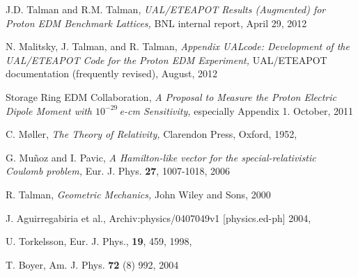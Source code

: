 \documentclass[]{article}
\begin{document}
\begin{thebibliography}{99}
J.D. Talman and R.M. Talman, \emph{ UAL/ETEAPOT Results 
(Augmented) for Proton EDM Benchmark Lattices,} BNL internal
report, April 29, 2012

N. Malitsky, J. Talman, and R. Talman, \emph{Appendix UALcode: Development of the
UAL/ETEAPOT Code for the Proton EDM Experiment,} UAL/ETEAPOT documentation
(frequently revised), August, 2012

Storage Ring EDM Collaboration, \emph{A Proposal to Measure the
Proton Electric Dipole Moment with $10^{-29}\,$e-cm Sensitivity,}
especially Appendix 1. October, 2011

C. M\o ller, \emph{The Theory of Relativity,} Clarendon Press,
Oxford, 1952, 

G. Mu\~{n}oz and I. Pavic, \emph{A Hamilton-like vector for
the special-relativistic Coulomb problem,} 
Eur. J. Phys. {\bf 27}, 1007-1018, 2006

R. Talman, \emph{Geometric Mechanics,} John Wiley and Sons, 2000

J. Aguirregabiria et al., 
Archiv:physics/0407049v1 [physics.ed-ph] 2004, 

U. Torkelsson, Eur. J. Phys., {\bf 19}, 459, 1998, 

T. Boyer, Am. J. Phys. {\bf 72} (8) 992, 2004

\end{thebibliography}
\end{document}
